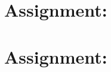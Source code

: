 \documentclass[a4paper,12pt,oneside]{scrreprt}
\begin{document}
	
	
   
	\section{Assignment:}
		
	
    
	\section{Assignment:}
		\subsection{} %
		
			\subsubsection{}
				
        
%         
			
			\subsubsection{}
			
			
		\subsection{} %
			
\end{document}
